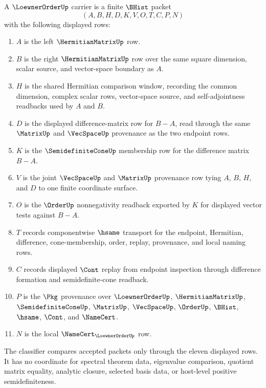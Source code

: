 \begin{definition}
\label{def:loewner-order-carrier}
A $\LoewnerOrderUp$ carrier is a finite $\BHist$ packet
$$
(A,B,H,D,K,V,O,T,C,P,N)
$$
with the following displayed rows:
\begin{enumerate}
\item $A$ is the left $\HermitianMatrixUp$ row.
\item $B$ is the right $\HermitianMatrixUp$ row over the same square dimension, scalar source, and vector-space boundary as $A$.
\item $H$ is the shared Hermitian comparison window, recording the common dimension, complex scalar rows, vector-space source, and self-adjointness readbacks used by $A$ and $B$.
\item $D$ is the displayed difference-matrix row for $B-A$, read through the same $\MatrixUp$ and $\VecSpaceUp$ provenance as the two endpoint rows.
\item $K$ is the $\SemidefiniteConeUp$ membership row for the difference matrix $B-A$.
\item $V$ is the joint $\VecSpaceUp$ and $\MatrixUp$ provenance row tying $A$, $B$, $H$, and $D$ to one finite coordinate surface.
\item $O$ is the $\OrderUp$ nonnegativity readback exported by $K$ for displayed vector tests against $B-A$.
\item $T$ records componentwise $\hsame$ transport for the endpoint, Hermitian, difference, cone-membership, order, replay, provenance, and local naming rows.
\item $C$ records displayed $\Cont$ replay from endpoint inspection through difference formation and semidefinite-cone readback.
\item $P$ is the $\Pkg$ provenance over $\LoewnerOrderUp$, $\HermitianMatrixUp$, $\SemidefiniteConeUp$, $\MatrixUp$, $\VecSpaceUp$, $\OrderUp$, $\BHist$, $\hsame$, $\Cont$, and $\NameCert$.
\item $N$ is the local $\NameCert_{\LoewnerOrderUp}$ row.
\end{enumerate}
The classifier compares accepted packets only through the eleven displayed rows. It has no coordinate for spectral theorem data, eigenvalue comparison, quotient matrix equality, analytic closure, selected basis data, or host-level positive semidefiniteness.
\end{definition}

